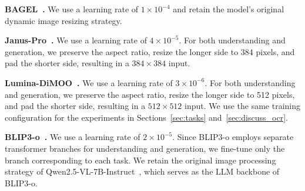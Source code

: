 \noindent\textbf{BAGEL~\cite{deng2025bagel}.}
We use a learning rate of $1\times10^{-4}$ and retain the model’s original dynamic image resizing strategy.

\noindent\textbf{Janus-Pro~\cite{chen2025januspro}.}
We use a learning rate of $4\times10^{-5}$. For both understanding and generation, we preserve the aspect ratio, resize the longer side to 384 pixels, and pad the shorter side, resulting in a $384\times384$ input.

\noindent\textbf{Lumina-DiMOO~\cite{xin2025lumina}.}
We use a learning rate of $3\times10^{-6}$. For both understanding and generation, we preserve the aspect ratio, resize the longer side to 512 pixels, and pad the shorter side, resulting in a $512\times512$ input. We use the same training configuration for the experiments in Sections~\ref{sec:tasks} and~\ref{sec:discuss_ocr}.

\noindent\textbf{BLIP3-o~\cite{chen2505blip3}.}
We use a learning rate of $2\times10^{-5}$. Since BLIP3-o employs separate transformer branches for understanding and generation, we fine-tune only the branch corresponding to each task. We retain the original image processing strategy of Qwen2.5-VL-7B-Instruct~\cite{bai2025qwen2}, which serves as the LLM backbone of BLIP3-o.


